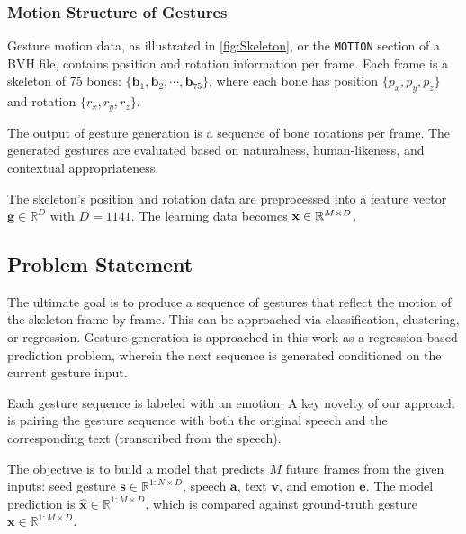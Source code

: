 \subsubsection{Motion Structure of Gestures}

Gesture motion data, as illustrated in \autoref{fig:Skeleton}, or the \texttt{MOTION} section of a BVH file, contains position and rotation information per frame. Each frame is a skeleton of 75 bones: $\{ \mathbf{b}_{1}, \mathbf{b}_{2}, \cdots , \mathbf{b}_{75} \}$, where each bone has position $\{ p_{x}, p_{y}, p_{z} \}$ and rotation $\{ r_{x}, r_{y}, r_{z} \}$.

The output of gesture generation is a sequence of bone rotations per frame. The generated gestures are evaluated based on naturalness, human-likeness, and contextual appropriateness.

The skeleton's position and rotation data are preprocessed into a feature vector $\mathbf{g} \in \mathbb{R}^{D}$ with $D = 1141$. The learning data becomes $\mathbf{x} \in \mathbb{R}^{M \times D}$. 

\subsection{Problem Statement}
\label{sec:ProblemStatement}

The ultimate goal is to produce a sequence of gestures that reflect the motion of the skeleton frame by frame. This can be approached via classification, clustering, or regression. Gesture generation is approached in this work as a regression-based prediction problem, wherein the next sequence is generated conditioned on the current gesture input.


Each gesture sequence is labeled with an emotion. A key novelty of our approach is pairing the gesture sequence with both the original speech and the corresponding text (transcribed from the speech).

The objective is to build a model that predicts $M$ future frames from the given inputs: seed gesture $\mathbf{s} \in \mathbb{R}^{1:N \times D}$, speech $\mathbf{a}$, text $\mathbf{v}$, and emotion $\mathbf{e}$. The model prediction is $\hat{\mathbf{x}} \in \mathbb{R}^{1:M \times D}$, which is compared against ground-truth gesture $\mathbf{x} \in \mathbb{R}^{1:M \times D}$.


